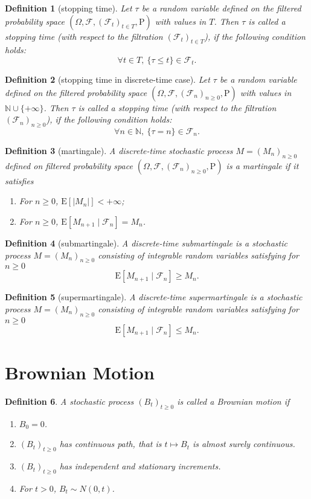 \documentclass{article}
\newtheorem{definition}{Definition}[section]
\theoremstyle{nonumberplain}
\begin{document}
\begin{definition}[stopping time]
Let $\tau$  be a random variable defined on the filtered probability space $(\Omega,\mathcal{F},(\mathcal{F}_{t})_{t\in T },\mathrm{P})$ with values in $T$. Then $\tau$  is called a stopping time (with respect to the filtration $(\mathcal{F}_{t})_{t\in T}$), if the following condition holds:
\[
\forall t\in T,\ \{\tau \leq t\}\in {\mathcal {F}}_{t}.
\]
\end{definition}

\begin{definition}[stopping time in discrete-time case]
	Let $\tau$  be a random variable defined on the filtered probability space $(\Omega,\mathcal{F},(\mathcal{F}_{n})_{n\ge0},\mathrm{P})$ with values in $\mathbb{N}\cup\{+\infty\}$. Then $\tau$  is called a stopping time (with respect to the filtration $(\mathcal{F}_{n})_{n\ge 0}$), if the following condition holds:
	\[
	\forall n\in\mathbb{N},\ \{\tau =n\}\in {\mathcal {F}}_{n}.
	\]
\end{definition}

\begin{definition}[martingale]
	A discrete-time stochastic process $M=(M_n)_{n\ge 0}$ defined on filtered probability space $(\Omega,\mathcal{F},(\mathcal{F}_{n})_{n\ge0},\mathrm{P})$ is a \emph{martingale} if it satisfies
	\begin{enumerate}
		\item For $n\ge0$, $\mathrm{E}[|M_n|]<+\infty$;
		\item For $n\ge0$, $\mathrm{E}[M_{n+1}\mid\mathcal{F}_n]=M_n$.
	\end{enumerate}
\end{definition}
\begin{definition}[submartingale]
A discrete-time submartingale is a stochastic process $M=(M_n)_{n\ge 0}$ consisting of integrable random variables satisfying for $n\ge0$
\[
\mathrm{E}[M_{n+1}\mid\mathcal{F}_n]\ge M_n.
\]
\end{definition}
\begin{definition}[supermartingale]
	A discrete-time supermartingale is a stochastic process $M=(M_n)_{n\ge 0}$ consisting of integrable random variables satisfying for $n\ge0$
	\[
	\mathrm{E}[M_{n+1}\mid\mathcal{F}_n]\le M_n.
	\]
\end{definition}


\section{Brownian Motion}
\begin{definition}
	A stochastic process $(B_t)_{t\ge0}$ is called a \emph{Brownian motion} if
	\begin{enumerate}
		\item $B_0=0$.
		\item $(B_t)_{t\ge0}$ has continuous path, that is $t\mapsto B_t$ is almost surely continuous.
		\item $(B_t)_{t\ge0}$ has independent and stationary increments.
		\item For $t>0$, $B_t\sim N(0,t)$.
	\end{enumerate}
\end{definition}
\newpage
\end{document}
